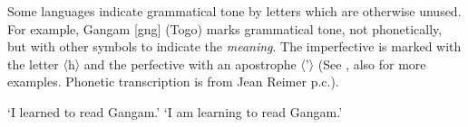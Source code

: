 \documentclass[output=paper]{langscibook}
\begin{document}
    
Some languages indicate grammatical tone by letters which are otherwise unused. For example, Gangam [gng] (Togo) marks grammatical tone, not phonetically, but with other symbols to indicate the \textit{meaning}. The imperfective is marked with the letter 〈h〉 and the perfective with an apostrophe 〈’〉 (See \citealt{HigdonEtAl2000}, also \citealt{Roberts2013} for more examples. Phonetic transcription is from Jean Reimer p.c.).

    \begin{exe}
        \ex \label{ex:ToneByUnusedLetters:3}
        \begin{xlist}
               \glt  `I learned to read Gangam.'
            \glt `I am learning to read Gangam.'
        \end{xlist}
\end{exe}
    
\end{document}
